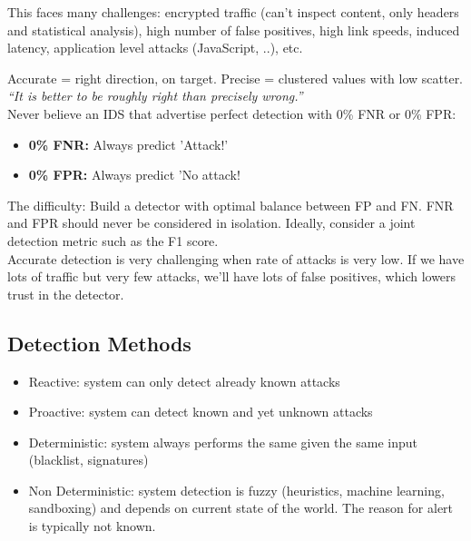 \documentclass[11pt,oneside,a4paper]{article}
\begin{document}
This faces many challenges: encrypted traffic (can't inspect content, only headers and statistical analysis), high number of false positives, high link speeds, induced latency, application level attacks (JavaScript, ..), etc.

Accurate = right direction, on target. Precise = clustered values with low scatter.\\

\textit{“It is better to be roughly right than precisely wrong.”}\\

Never believe an IDS that advertise perfect detection with 0\% FNR or 0\% FPR:

\vspace{-\topsep}
\begin{itemize}
	\setlength{\itemsep}{0pt}
	\setlength{\parskip}{0pt}
	\item \textbf{0\% FNR:} Always predict 'Attack!'
	\item \textbf{0\% FPR:} Always predict 'No attack!
\end{itemize}
\vspace{-\topsep}

The difficulty: Build a detector with optimal balance between FP and FN. FNR and FPR should never be considered in isolation. Ideally, consider a joint detection metric such as the F1 score.\\
Accurate detection is very challenging when rate of attacks is very low. If we have lots of traffic but very few attacks, we'll have lots of false positives, which lowers trust in the detector. 

\subsection{Detection Methods}

\vspace{-\topsep}
\begin{itemize}
	\setlength{\itemsep}{0pt}
	\setlength{\parskip}{0pt}
	\item Reactive: system can only detect already known attacks
	\item Proactive: system can detect known and yet unknown attacks
	\item Deterministic: system always performs the same given the same input (blacklist, signatures)
	\item Non Deterministic: system detection is fuzzy (heuristics, machine	learning, sandboxing) and depends on current state of the world. The reason for alert is typically not known.
\end{itemize}
\vspace{-\topsep}
\end{document}
